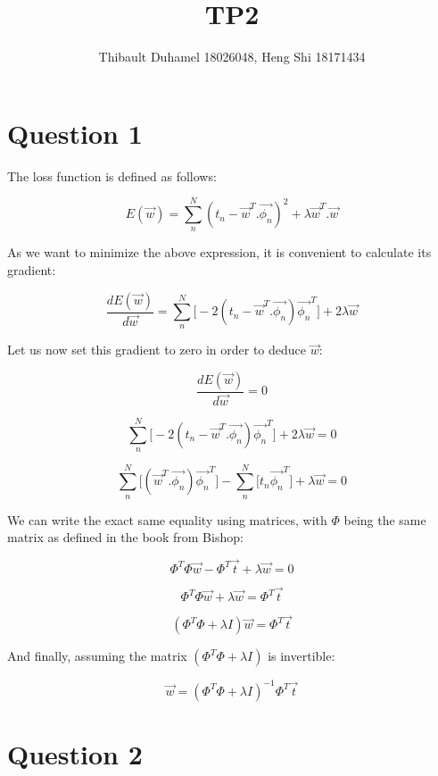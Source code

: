 \documentclass{article}
\title{TP2}
\author{Thibault Duhamel 18026048, Heng Shi 18171434 }
\begin{document}
\maketitle

\section*{Question 1}

The loss function is defined as follows: 

$$E(\overrightarrow{w}) = \sum_n^N{(t_n - \overrightarrow{w}^T.\overrightarrow{\phi_n})^2} + \lambda \overrightarrow{w}^T.\overrightarrow{w}$$

As we want to minimize the above expression, it is convenient to calculate its gradient:

$$\frac{dE(\overrightarrow{w})}{d\overrightarrow{w}} = \sum_n^N{\big[-2(t_n - \overrightarrow{w}^T.\overrightarrow{\phi_n})\overrightarrow{\phi_n}^T\big]} + 2\lambda \overrightarrow{w}$$

Let us now set this gradient to zero in order to deduce $\overrightarrow{w}$:

$$\frac{dE(\overrightarrow{w})}{d\overrightarrow{w}} = 0$$

$$\sum_n^N{\big[-2(t_n - \overrightarrow{w}^T.\overrightarrow{\phi_n})\overrightarrow{\phi_n}^T\big]} + 2\lambda \overrightarrow{w} = 0$$

$$\sum_n^N{\big[ (\overrightarrow{w}^T.\overrightarrow{\phi_n})\overrightarrow{\phi_n}^T\big]} - \sum_n^N{\big[t_n\overrightarrow{\phi_n}^T\big]} + \lambda \overrightarrow{w} = 0$$

We can write the exact same equality using matrices, with $\Phi$ being the same matrix as defined in the book from Bishop:

$$ \Phi^T \Phi \overrightarrow{w} - \Phi^T \overrightarrow{t}  + \lambda \overrightarrow{w} = 0$$

$$ \Phi^T \Phi \overrightarrow{w} + \lambda \overrightarrow{w} = \Phi^T \overrightarrow{t}$$

$$ (\Phi^T \Phi + \lambda I)\overrightarrow{w} = \Phi^T \overrightarrow{t}$$

And finally, assuming the matrix $(\Phi^T \Phi + \lambda I)$ is invertible:

$$\boxed{\overrightarrow{w} = (\Phi^T \Phi + \lambda I)^{-1}\Phi^T \overrightarrow{t}}$$

\section*{Question 2}
\end{document}

